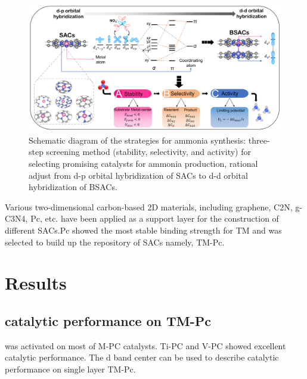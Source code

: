 \documentclass[isoft]{ufgtexposter}
\begin{document}
\begin{poster}
        \begin{figure}
            \centering
            \captionsetup{type=figure}
            \includegraphics[scale=2]{images/Picture 1.png}
            \caption{Schematic diagram of the strategies for ammonia synthesis: three-step screening method (stability, selectivity, and activity) for selecting promising catalysts for ammonia production, rational adjust from d-p orbital hybridization of SACs to d-d orbital hybridization of BSACs.}
            \label{fig:lstm}
        \end{figure}
        Various two-dimensional carbon-based 2D materials, including graphene, C2N, g-C3N4, Pc, etc. have been applied as a support layer for the construction of different SACs.Pc showed the most stable binding strength for TM and was selected to build up the repository of SACs namely, TM-Pc.
        
    
        \section{Results}%
            \subsection{ catalytic performance on TM-Pc}  was activated on most of M-PC catalysts. Ti-PC and V-PC showed excellent  catalytic performance. The d band center can be used to describe  catalytic performance on single layer TM-Pc.
    



\end{poster}
\end{document}
